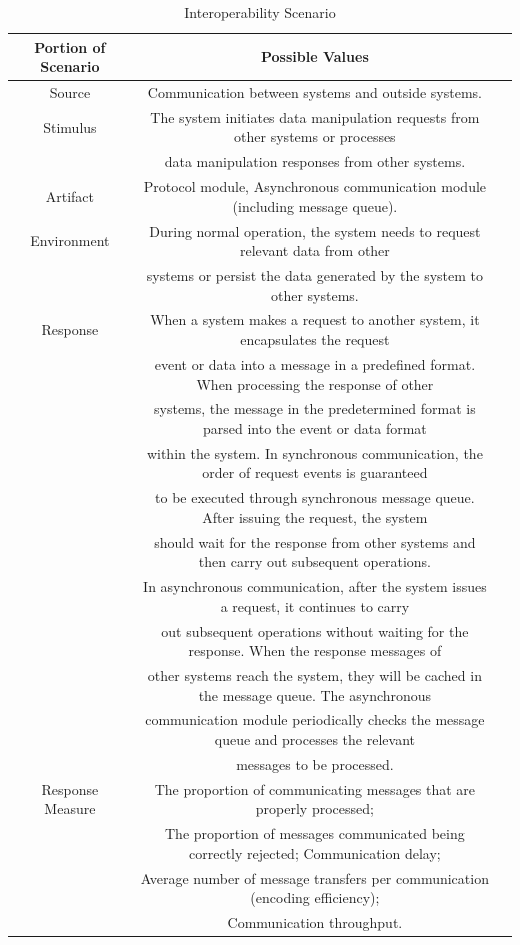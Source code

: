 \documentclass{article}
\begin{document}
	\begin{center}
		\begin{table}[!htb]
		\begin{tabular}{ccc}
		\toprule  
		Portion of Scenario & Possible Values\\
		\midrule 
		Source & Communication between systems and outside systems.\\
		Stimulus & The system initiates data manipulation requests from other systems or processes \\
		& data manipulation responses from other systems.\\
		Artifact & Protocol module, Asynchronous communication module (including message queue).\\
		Environment & During normal operation, the system needs to request relevant data from other \\
		& systems or persist the data generated by the system to other systems.\\
		Response & When a system makes a request to another system, it encapsulates the request \\
		& event or data into a message in a predefined format. When processing the response of other \\
		& systems, the message in the predetermined format is parsed into the event or data format \\
		& within the system. In synchronous communication, the order of request events is guaranteed\\
		& to be executed through synchronous message queue. After issuing the request, the system \\
		& should wait for the response from other systems and then carry out subsequent operations. \\
		& In asynchronous communication, after the system issues a request, it continues to carry \\
		& out subsequent operations without waiting for the response. When the response messages of \\
		& other systems reach the system, they will be cached in the message queue. The asynchronous \\
		& communication module periodically checks the message queue and processes the relevant \\
		& messages to be processed.\\
		Response Measure & The proportion of communicating messages that are properly processed; \\
		& The proportion of messages communicated being correctly rejected; Communication delay; \\
		& Average number of message transfers per communication (encoding efficiency); \\
		& Communication throughput.\\
		\bottomrule
		\end{tabular}
		\caption{Interoperability Scenario}
		\end{table}
	\end{center}
\end{document}
